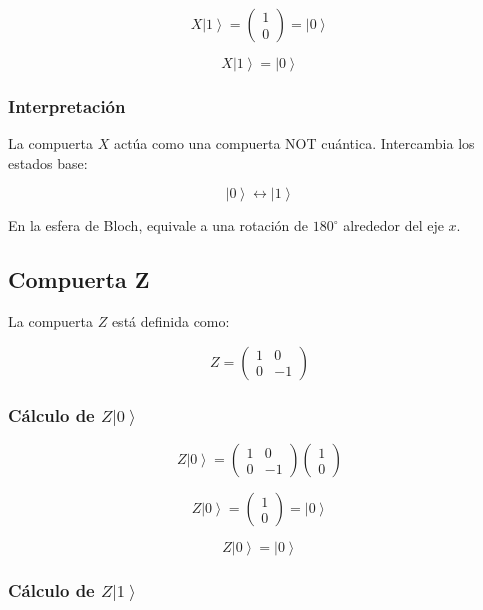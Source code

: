 \documentclass[12pt,a4paper]{article}
\newcommand{\ket}[1]{\left|#1\right\rangle}
\begin{document}
\[
X\ket{1}
=
\begin{pmatrix}
1\\
0
\end{pmatrix}
=
\ket{0}
\]

\begin{resultado}
\[
\boxed{X\ket{1}=\ket{0}}
\]
\end{resultado}

\subsubsection*{Interpretación}

La compuerta \(X\) actúa como una compuerta NOT cuántica. Intercambia los estados base:

\[
\ket{0}\leftrightarrow\ket{1}
\]

En la esfera de Bloch, equivale a una rotación de \(180^\circ\) alrededor del eje \(x\).

\subsection{Compuerta Z}

La compuerta \(Z\) está definida como:

\[
Z=
\begin{pmatrix}
1 & 0\\
0 & -1
\end{pmatrix}
\]

\subsubsection*{Cálculo de \texorpdfstring{$Z\ket{0}$}{Z ket 0}}

\[
Z\ket{0}
=
\begin{pmatrix}
1 & 0\\
0 & -1
\end{pmatrix}
\begin{pmatrix}
1\\
0
\end{pmatrix}
\]

\[
Z\ket{0}
=
\begin{pmatrix}
1\\
0
\end{pmatrix}
=
\ket{0}
\]

\begin{resultado}
\[
\boxed{Z\ket{0}=\ket{0}}
\]
\end{resultado}

\subsubsection*{Cálculo de \texorpdfstring{$Z\ket{1}$}{Z ket 1}}
\end{document}
